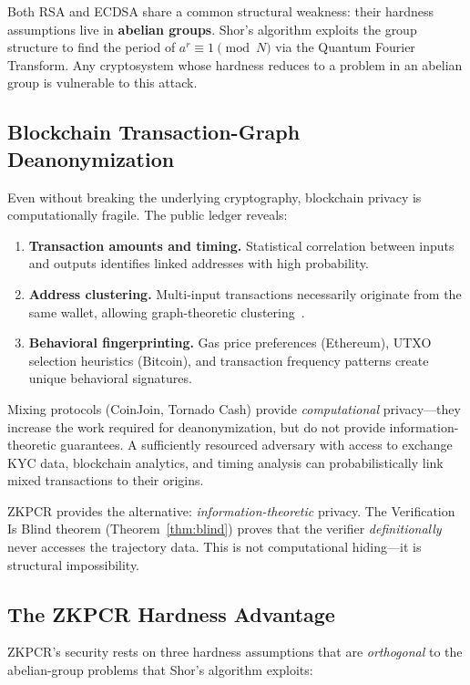 \documentclass[12pt,a4paper]{article}
\begin{document}
Both RSA and ECDSA share a common structural weakness: their hardness assumptions live in \textbf{abelian groups}. Shor's algorithm exploits the group structure to find the period of $a^r \equiv 1 \pmod{N}$ via the Quantum Fourier Transform. Any cryptosystem whose hardness reduces to a problem in an abelian group is vulnerable to this attack.

\subsection{Blockchain Transaction-Graph Deanonymization}
\label{subsec:txgraph}

Even without breaking the underlying cryptography, blockchain privacy is computationally fragile. The public ledger reveals:
\begin{enumerate}[noitemsep]
\item \textbf{Transaction amounts and timing.} Statistical correlation between inputs and outputs identifies linked addresses with high probability.
\item \textbf{Address clustering.} Multi-input transactions necessarily originate from the same wallet, allowing graph-theoretic clustering~\cite{meiklejohn2013fistful}.
\item \textbf{Behavioral fingerprinting.} Gas price preferences (Ethereum), UTXO selection heuristics (Bitcoin), and transaction frequency patterns create unique behavioral signatures.
\end{enumerate}

Mixing protocols (CoinJoin, Tornado Cash) provide \emph{computational} privacy---they increase the work required for deanonymization, but do not provide information-theoretic guarantees. A sufficiently resourced adversary with access to exchange KYC data, blockchain analytics, and timing analysis can probabilistically link mixed transactions to their origins.

ZKPCR provides the alternative: \emph{information-theoretic} privacy. The Verification Is Blind theorem (Theorem~\ref{thm:blind}) proves that the verifier \emph{definitionally} never accesses the trajectory data. This is not computational hiding---it is structural impossibility.

\subsection{The ZKPCR Hardness Advantage}
\label{subsec:zkpcr-advantage}

ZKPCR's security rests on three hardness assumptions that are \emph{orthogonal} to the abelian-group problems that Shor's algorithm exploits:
\end{document}
